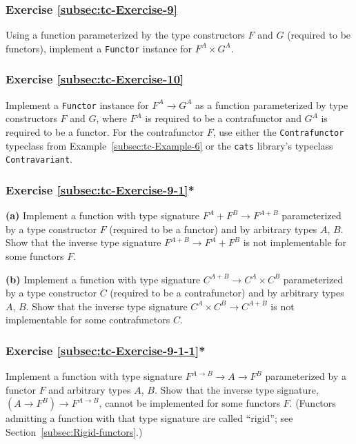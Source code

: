 \subsubsection{Exercise \label{subsec:tc-Exercise-9}\ref{subsec:tc-Exercise-9}}

Using a function parameterized by the type constructors $F$ and $G$
(required to be functors), implement a \lstinline!Functor! instance
for $F^{A}\times G^{A}$. 

\subsubsection{Exercise \label{subsec:tc-Exercise-10}\ref{subsec:tc-Exercise-10}}

Implement a \lstinline!Functor! instance for $F^{A}\rightarrow G^{A}$
as a function parameterized by type constructors $F$ and $G$, where
$F^{A}$ is required to be a contrafunctor and $G^{A}$ is required
to be a functor. For the contrafunctor $F$, use either the \lstinline!Contrafunctor!
typeclass from Example~\ref{subsec:tc-Example-6} or the \texttt{cats}
library\textsf{'}s typeclass \lstinline!Contravariant!.

\subsubsection{Exercise \label{subsec:tc-Exercise-9-1}\ref{subsec:tc-Exercise-9-1}{*}}

\textbf{(a)} Implement a function with type signature $F^{A}+F^{B}\rightarrow F^{A+B}$
parameterized by a type constructor $F$ (required to be a functor)
and by arbitrary types $A$, $B$. Show that the inverse type signature
$F^{A+B}\rightarrow F^{A}+F^{B}$ is not implementable for some functors
$F$. 

\textbf{(b)} Implement a function with type signature $C^{A+B}\rightarrow C^{A}\times C^{B}$
parameterized by a type constructor $C$ (required to be a contrafunctor)
and by arbitrary types $A$, $B$. Show that the inverse type signature
$C^{A}\times C^{B}\rightarrow C^{A+B}$ is not implementable for some
contrafunctors $C$.

\subsubsection{Exercise \label{subsec:tc-Exercise-9-1-1}\ref{subsec:tc-Exercise-9-1-1}{*}}

Implement a function with type signature $F^{A\rightarrow B}\rightarrow A\rightarrow F^{B}$
parameterized by a functor $F$ and arbitrary types $A$, $B$. Show
that the inverse type signature, $(A\rightarrow F^{B})\rightarrow F^{A\rightarrow B}$,
cannot be implemented for some functors $F$. (Functors admitting
a function with that type signature are called \textsf{``}rigid\textsf{''}; see Section~\ref{subsec:Rigid-functors}.)

